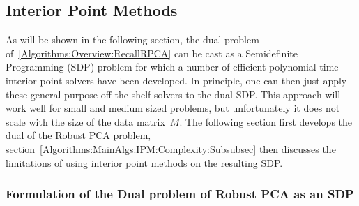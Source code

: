 \documentclass{../../common/projectreport}
\begin{document}
\subsection{Interior Point Methods}
\label{Algorithms:MainAlgs:IPM:Subsec}

As will be shown in the following section, the dual problem of~\eqref{Algorithms:Overview:RecallRPCA} can be cast as a Semidefinite Programming (SDP) problem for which a number of efficient polynomial-time interior-point solvers have been developed. In principle, one can then just apply these general purpose off-the-shelf solvers to the dual SDP. This approach will work well for small and medium sized problems, but unfortunately it does not scale with the size of the data matrix~$M$. The following section first develops the dual of the Robust PCA problem, section~\ref{Algorithms:MainAlgs:IPM:Complexity:Subsubsec} then discusses the limitations of using interior point methods on the resulting SDP. 


\subsubsection{Formulation of the Dual problem of Robust PCA as an SDP}
\label{Algorithms:MainAlgs:IPM:SDPform:Subsubsec}
\end{document}
